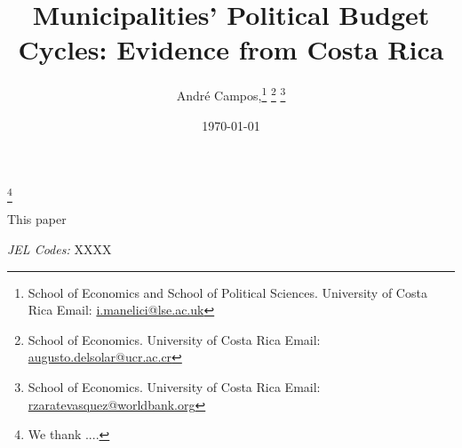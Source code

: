 \documentclass[12pt,a4paper]{article}
\begin{document}
	\title{\huge{Municipalities' Political Budget Cycles: Evidence from Costa Rica}}\thanks{\footnotesize We thank ....}
	
	\author{\large \vspace{0.5cm} André Campos,\thanks{School of Economics and School of Political Sciences. University of Costa Rica Email: \href{mailto:i.manelici@lse.ac.uk}{i.manelici@lse.ac.uk}}
		\thanks{School of Economics. University of Costa Rica Email: \href{mailto:augusto.delsolar@ucr.ac.cr}{augusto.delsolar@ucr.ac.cr}}
		\thanks{School of Economics. University of Costa Rica Email: \href{mailto:rzaratevasquez@worldbank.org}{rzaratevasquez@worldbank.org}}
	}
	\renewcommand\Authands{ and }
	\date{\today}
	\onehalfspacing
	\setlength{\parindent}{1cm}
	\clearpage\maketitle
	\thispagestyle{empty}
	\setcounter{page}{0}
	\maketitle
	



\onehalfspacing
\setlength{\parindent}{1cm}
\clearpage\maketitle
\thispagestyle{empty}
\setcounter{page}{0}
\maketitle

\begin{small}
\onehalfspacing
\vspace{0.75cm}
This paper 
\vspace{20pt}

\textit{JEL Codes:} XXXX
\end{small}


\end{document}
